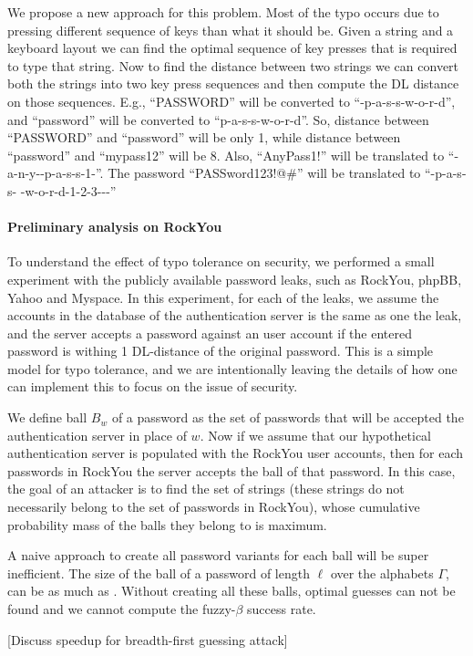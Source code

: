 We propose a new approach for this problem. Most of the typo occurs due to
pressing different sequence of keys than what it should be. Given a string and a
keyboard layout we can find the optimal sequence of key presses that is required
to type that string. Now to find the distance between two strings we can convert
both the strings into two key press sequences and then compute the DL distance
on those sequences. E.g., ``PASSWORD'' will be converted to
``\caps -p-a-s-s-w-o-r-d'', and ``password'' will be converted to
``p-a-s-s-w-o-r-d''. So, distance between ``PASSWORD'' and ``password'' will be
only 1, while distance between ``password'' and ``mypass12'' will be 8. Also,
``AnyPass1!'' will be translated to ``\shift -a-n-y-\shift -p-a-s-s-1-''.
The password ``PASSword123!@\#'' will be translated to ``\caps -p-a-s-s-\caps
-w-o-r-d-1-2-3---''

\paragraph{Preliminary analysis on RockYou}
To understand the effect of typo tolerance on security, we performed a small
experiment with the publicly available password leaks, such as RockYou, phpBB,
Yahoo and Myspace.  In this experiment, for each of the leaks, we assume the
accounts in the database of the authentication server is the same as one the
leak, and the server accepts a password against an user account if the entered
password is withing 1 DL-distance of the original password.  This is a simple
model for typo tolerance, and we are intentionally leaving the details of how
one can implement this to focus on the issue of security.


We define ball $B_{w}$ of a password as the set of passwords that will be
accepted the authentication server in place of $w$.  Now if we assume that
our hypothetical authentication server is populated with the RockYou user
accounts, then for each passwords in RockYou the server accepts the ball of that
password.  In this case, the goal of an attacker is to find the set of strings
(these strings do not necessarily belong to the set of passwords in RockYou),
whose cumulative probability mass of the balls they belong to is maximum.


A naive approach to create all password variants for each ball will be super
inefficient.  The size of the ball of a password of length $\ell$ over the
alphabets $\Gamma$, can be as much as . Without
creating all these balls, optimal guesses can not be found and we cannot compute
the fuzzy-$\beta$ success rate.





[Discuss speedup for breadth-first guessing attack]


\fi








